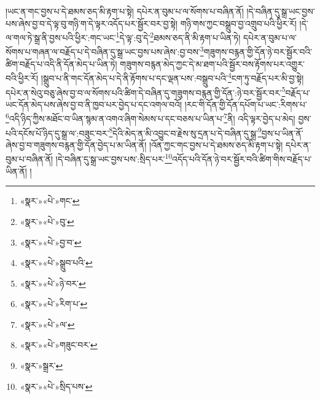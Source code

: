 །ཡང་ན་གང་བྱས་པ་དེ་ཐམས་ཅད་མི་རྟག་པ་སྟེ། དཔེར་ན་བུམ་པ་ལ་སོགས་པ་བཞིན་ནོ། །དེ་བཞིན་དུ་སྒྲ་ཡང་བྱས་པས་ཞེས་བྱ་བ་དེ་ལྟ་བུ་གཉི་ག་དེ་ལྟར་འདོད་པར་སྦྱོར་བར་བྱ་སྟེ། གཉི་གས་ཀྱང་བསྒྲུབ་བྱ་འགྲུབ་པའི་ཕྱིར་རོ། །དེ་ལ་གལ་ཏེ་སྒྲ་ནི་བྱས་པའི་ཕྱིར་:གང་ཡང་\footnote{«སྣར་»«པེ་»གང་}དེ་ལྟ་:བུ་དེ་\footnote{«སྣར་»«པེ་»བུ་}ཐམས་ཅད་ནི་མི་རྟག་པ་ཡིན་ཏེ། དཔེར་ན་བུམ་པ་ལ་སོགས་པ་གཞན་ལ་བརྗོད་པ་དེ་བཞིན་དུ་སྒྲ་ཡང་བྱས་པས་ཞེས་:བྱ་བས་\footnote{«སྣར་»«པེ་»བྱ་བ་}གཟུགས་བརྙན་གྱི་དོན་ཉེ་བར་སྦྱོར་བའི་ཚིག་བརྗོད་པ་འདི་ནི་དོན་མེད་པ་ཡིན་ཏེ། གཟུགས་བརྙན་མེད་ཀྱང་དེ་མ་ཐག་པའི་སྦྱོར་བས་རྟོགས་པར་འགྱུར་བའི་ཕྱིར་རོ། །སྒྲུབ་པ་ནི་གང་དོན་མེད་པ་དེ་ནི་རྟོགས་པ་དང་ལྡན་པས་:བསྒྲུབ་པའི་\footnote{«སྣར་»«པེ་»སྒྲུབ་པའི་}ངག་ཏུ་བརྗོད་པར་མི་བྱ་སྟེ། དཔེར་ན་སེའུ་བཅུ་ཞེས་བྱ་བ་ལ་སོགས་པའི་ཚིག་དེ་བཞིན་དུ་གཟུགས་བརྙན་གྱི་དོན་:ཉེ་བར་སྦྱོར་བར་\footnote{«སྣར་»«པེ་»ཉེ་བར་}བརྗོད་པ་ཡང་དོན་མེད་པས་ཞེས་བྱ་བ་ནི་ཁྱབ་པར་བྱེད་པ་དང་འགལ་བའོ། །རང་གི་དོན་གྱི་དོན་དཔོག་པ་ཡང་:རིགས་པ་\footnote{«སྣར་»«པེ་»རིག་པ་}འདི་ཉིད་ཀྱིས་མཐོང་བ་ཡིན་སྙམ་ན་འགའ་ཞིག་སེམས་པ་དང་བཅས་པ་ཡིན་པ་\footnote{«སྣར་»«པེ་»ལ་}ནི། འདི་ལྟར་བྱེད་པ་མེད། བྱས་པའི་དངོས་པོ་ཉིད་དུ་སྒྲ་ལ་:བཟུང་བར་\footnote{«སྣར་»«པེ་»གཟུང་བར་}དེའི་མེད་ན་མི་འབྱུང་བ་རྗེས་སུ་དྲན་པ་དེ་བཞིན་དུ་སྒྲ་\footnote{«སྣར་»སྒྲར་}བྱས་པ་ཡིན་ནོ་ཞེས་བྱ་བ་གཟུགས་བརྙན་གྱི་དོན་བྱེད་པ་མ་ཡིན་ནོ། །འོན་ཀྱང་གང་བྱས་པ་དེ་ཐམས་ཅད་མི་རྟག་པ་སྟེ། དཔེར་ན་བུམ་པ་བཞིན་ནོ། །དེ་བཞིན་དུ་སྒྲ་ཡང་བྱས་པས་:སྲིད་པར་\footnote{«སྣར་»«པེ་»སྲིད་པས་}འདོད་པའི་དོན་ཉེ་བར་སྦྱོར་བའི་ཚིག་གིས་བརྗོད་པ་ཡིན་ནོ། །
